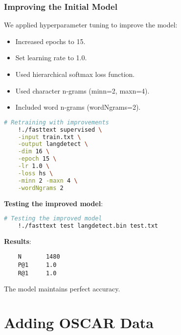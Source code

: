 \documentclass{beamer}
\begin{document}
\begin{frame}[fragile]
    \frametitle{Improving the Initial Model}
    We applied hyperparameter tuning to improve the model:

    \begin{itemize}
        \item Increased epochs to 15.
        \item Set learning rate to 1.0.
        \item Used hierarchical softmax loss function.
        \item Used character n-grams (minn=2, maxn=4).
        \item Included word n-grams (wordNgrams=2).
    \end{itemize}

    \begin{lstlisting}[language=bash]
    # Retraining with improvements
    !./fasttext supervised \
    -input train.txt \
    -output langdetect \
    -dim 16 \
    -epoch 15 \
    -lr 1.0 \
    -loss hs \
    -minn 2 -maxn 4 \
    -wordNgrams 2
    \end{lstlisting}

    \textbf{Testing the improved model}:

    \begin{lstlisting}[language=bash]
    # Testing the improved model
    !./fasttext test langdetect.bin test.txt
    \end{lstlisting}

    \textbf{Results}:
    \begin{lstlisting}
    N       1480
    P@1     1.0
    R@1     1.0
    \end{lstlisting}

    The model maintains perfect accuracy.
\end{frame}

\section{Adding OSCAR Data}
\end{document}
